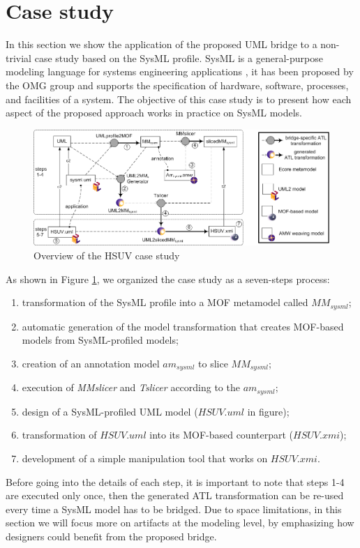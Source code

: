 \section{Case study}\label{sec:caseStudy}
In this section we show the application of the proposed UML bridge to a non-trivial case study based on the SysML profile.
SysML is a general-purpose modeling language for systems engineering applications \cite{sysml}, it has been proposed by the OMG group
and supports the specification of  hardware, software, processes, and facilities of a system.
The objective of this case study is to present how each aspect of the proposed approach works in practice on SysML models.
%
\vspace{-.4cm}
\begin{figure}[htbp]
	\centering
		\includegraphics[width=1\textwidth]{figures/caseStudy.png}
	\caption{Overview of the HSUV case study}
	\label{fig:caseStudy}
\end{figure}
\vspace{-.4cm}

As shown in Figure \ref{fig:caseStudy}, we organized the case study as a seven-steps process:
%
\begin{enumerate}
	\item transformation of the SysML profile into a MOF metamodel called $MM_{sysml}$;
	\item automatic generation of the model transformation that creates MOF-based models from SysML-profiled models;
	\item creation of an annotation model $am_{sysml}$ to slice $MM_{sysml}$;
	\item execution of \textit{MMslicer} and \textit{Tslicer} according to the $am_{sysml}$;
	\item design of a SysML-profiled UML model ($HSUV.uml$ in figure);
	\item transformation of $HSUV.uml$ into its MOF-based counterpart ($HSUV.xmi$);
	\item development of a simple manipulation tool that works on $HSUV.xmi$.
\end{enumerate}
%
Before going into the details of each step, it is important to note that steps 1-4 are executed only once, 
then the generated ATL transformation can be re-used every time a SysML model has to be bridged.
Due to space limitations, in this section we will focus more on artifacts at the modeling level, by emphasizing
how designers could benefit from the proposed bridge.


